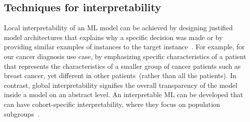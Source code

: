 \subsection{Techniques for interpretability}
Local interpretability of an ML model can be achieved by designing justified model architectures that explains why a specific decision was made or by providing similar examples of instances to the target instance~\cite{stiglic2020interpretability}. For example, for our cancer diagnosis use case, by emphasizing specific characteristics of a patient that represents the characteristics of a smaller group of cancer patients such as breast cancer, yet different in other patients~(rather than all the patients). In contrast, global interpretability signifies the overall transparency of the model inside a model on an abstract level. An interpretable ML can be developed that can have cohort-specific interpretability, where they focus on population subgroups~\cite{stiglic2020interpretability}. 

